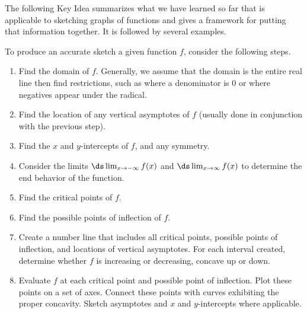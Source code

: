The following Key Idea summarizes what we have learned so far that is applicable to sketching graphs of functions and gives a framework for putting that information together. It is followed by several examples.

\begin{keyidea}\label{idea:sketch}
To produce an accurate sketch a given function $f$, consider the following steps.
\begin{enumerate}
	\item	Find the domain of $f$. Generally, we assume that the domain is the entire real line then find restrictions, such as where a denominator is 0 or where negatives appear under the radical.
	\item	Find the location of any vertical asymptotes of $f$ (usually done in conjunction with the previous step).
	\item	Find the $x$ and $y$-intercepts of $f$, and any symmetry.
	\item	Consider the limits $\ds\lim_{x\to-\infty}f(x)$ and $\ds\lim_{x\to\infty}f(x)$ to determine the end behavior of the function.
	\item	Find the critical points of $f$.
	\item	Find the possible points of inflection of $f$.
	\item	Create a number line that includes all critical points, possible points of inflection, and locations of vertical asymptotes. For each interval created, determine whether $f$ is increasing or decreasing, concave up or down.
	\item	Evaluate $f$ at each critical point and possible point of inflection. Plot these points on a set of axes. Connect these points with curves exhibiting the proper concavity. Sketch asymptotes and $x$ and $y$-intercepts where applicable.
\end{enumerate}
\end{keyidea}


